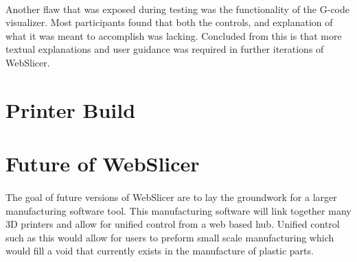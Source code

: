 \paragraph{}
Another flaw that was exposed during testing was the functionality of the G-code visualizer.
Most participants found that both the controls, and explanation of what it was meant to accomplish was lacking.
Concluded from this is that more textual explanations and user guidance was required in further iterations of WebSlicer.

\section{Printer Build}

\section{Future of WebSlicer}
\paragraph{}
The goal of future versions of WebSlicer are to lay the groundwork for a larger manufacturing software tool.
This manufacturing software will link together many 3D printers and allow for unified control from a web based hub.
Unified control such as this would allow for users to preform small scale manufacturing which would fill a void that currently exists in the manufacture of plastic parts.